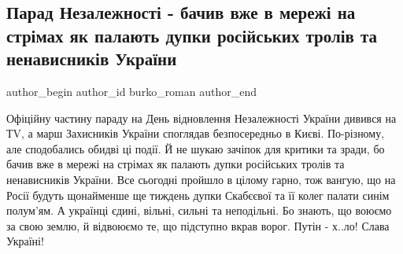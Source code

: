  
 
 
 
 
 
\subsection{Парад Незалежності - бачив вже в мережі на стрімах як палають дупки російських тролів та ненависників України}
\label{sec:24_08_2021.fb.burko_roman.1.nezalezhnist_skabeeva}
 
\ifcmt
 author_begin
   author_id burko_roman
 author_end
\fi

Офіційну частину параду на День відновлення Незалежності України дивився на ТV,
а марш Захисників України споглядав безпосередньо в Києві. По-різному, але
сподобались обидві ці події. Й не шукаю зачіпок для критики та зради, бо бачив
вже в мережі на стрімах як палають дупки російських тролів та ненависників
України. Все сьогодні пройшло в цілому гарно, тож вангую, що на Росії будуть
щонайменше ще тиждень дупки Скабєєвої та її колег палати синім полум'ям. А
українці єдині, вільні, сильні та неподільні. Бо знають, що воюємо за свою
землю, й відвоюємо те, що підступно вкрав ворог. Путін - х..ло! Слава Україні!


